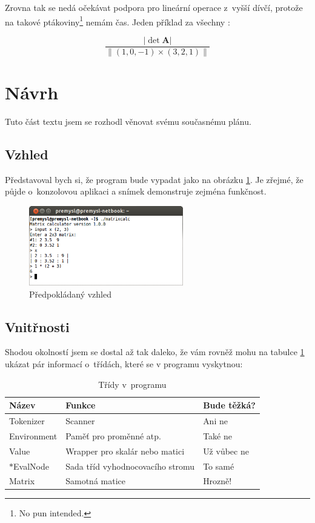 \documentclass[a4paper,11pt]{article}
\begin{document}
Zrovna tak se nedá očekávat podpora pro lineární operace z~vyšší dívčí, protože na takové ptákoviny\footnote{No pun intended.} nemám čas. Jeden příklad za všechny \cite{olsak}:

\[\frac{\left| \det \textbf{A} \right|}{\left\|(1, 0, -1)\times(3, 2, 1)\right\|}\]

\section{Návrh}
Tuto část textu jsem se rozhodl věnovat svému současnému plánu.

\subsection{Vzhled}
Představoval bych si, že program bude vypadat jako na obrázku \ref{fig:vzhled}. Je zřejmé, že půjde o~konzolovou aplikaci a snímek demonstruje zejména funkčnost.

\begin{figure}[h]
\centering
\includegraphics[width=0.6\textwidth]{screenshot.png}
\caption{Předpokládaný vzhled}
\label{fig:vzhled}
\end{figure}

\usetikzlibrary{arrows}

\subsection{Vnitřnosti}
Shodou okolností jsem se dostal až tak daleko, že vám rovněž mohu na tabulce \ref{tab:tridy} ukázat pár informací o~třídách, které se v programu vyskytnou:

\begin{table}[h]
\centering
\caption{Třídy v~programu}
\label{tab:tridy}
\begin{tabular}{ l l l }
\textbf{Název} & \textbf{Funkce} & \textbf{Bude těžká?} \\
\hline
Tokenizer & Scanner & Ani ne \\
Environment & Paměť pro proměnné atp. & Také ne \\
Value & Wrapper pro skalár nebo matici & Už vůbec ne \\
$\ast$EvalNode & Sada tříd vyhodnocovacího stromu & To samé \\
Matrix & Samotná matice & Hrozně!
\end{tabular}
\end{table}
\end{document}
